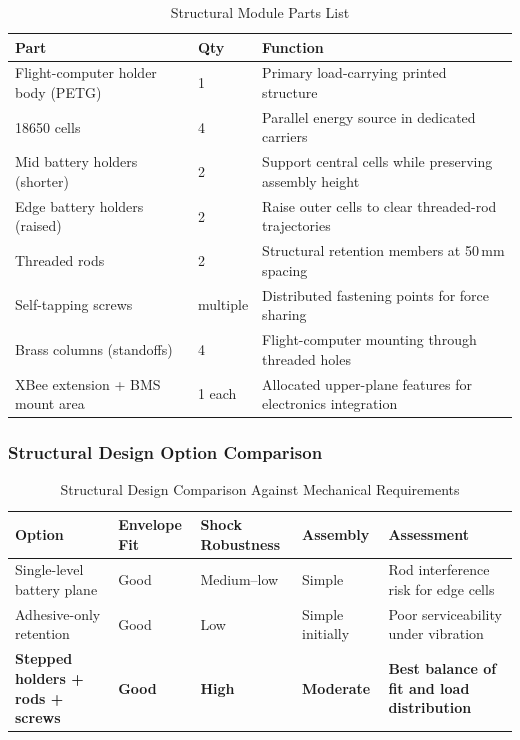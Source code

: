 \begin{table}[!htbp]
  \centering
  \caption{Structural Module Parts List}
  \label{tab:structural_parts}
  \small
  \renewcommand{\arraystretch}{1.2}
  \begin{tabular}{@{}p{4cm}|p{3.1cm}|p{6.7cm}@{}}
    \toprule
    \rowcolor{gray!22}\textbf{Part} & \textbf{Qty} & \textbf{Function} \\ \midrule
    Flight-computer holder body (PETG) & 1 & Primary load-carrying printed structure \\
    18650 cells & 4 & Parallel energy source in dedicated carriers \\
    Mid battery holders (shorter) & 2 & Support central cells while preserving assembly height \\
    Edge battery holders (raised) & 2 & Raise outer cells to clear threaded-rod trajectories \\
    Threaded rods & 2 & Structural retention members at 50\,mm spacing \\
    Self-tapping screws & multiple & Distributed fastening points for force sharing \\
    Brass columns (standoffs) & 4 & Flight-computer mounting through threaded holes \\
    XBee extension + BMS mount area & 1 each & Allocated upper-plane features for electronics integration \\ \bottomrule
  \end{tabular}
\end{table}

\subsubsection{Structural Design Option Comparison}

\begin{table}[!htbp]
  \centering
  \caption{Structural Design Comparison Against Mechanical Requirements}
  \label{tab:structural_option_compare}
  \small
  \renewcommand{\arraystretch}{1.2}
  \begin{tabular}{@{}p{3.5cm}|p{2.5cm}|p{2.5cm}|p{2.5cm}|p{3cm}@{}}
    \toprule
    \rowcolor{gray!22}\textbf{Option} & \textbf{Envelope Fit} & \textbf{Shock Robustness} & \textbf{Assembly} & \textbf{Assessment} \\ \midrule
    Single-level battery plane & Good & Medium--low & Simple & Rod interference risk for edge cells \\
    Adhesive-only retention & Good & Low & Simple initially & Poor serviceability under vibration \\
    \textbf{Stepped holders + rods + screws} & \textbf{Good} & \textbf{High} & \textbf{Moderate} & \textbf{Best balance of fit and load distribution} \\ \bottomrule
  \end{tabular}
\end{table}

